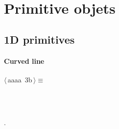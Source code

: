 \documentclass[11pt,oneside]{article}	%
\begin{document}
\section{Primitive objets}
\subsection{1D primitives}

\paragraph{Curved line}
\begin{flushleft} \small \label{scrap5}
\protect{}$\langle\,$aaaa\nobreak\ {\footnotesize 3b}$\,\rangle\equiv$
\vspace{-1ex}
\begin{list}{}{} \item
\mbox{}\verb@@\\
\mbox{}\verb@@\\
\mbox{}\verb@@{\NWsep}
\end{list}
\vspace{-1ex}
\footnotesize\addtolength{\baselineskip}{-1ex}
\begin{list}{}{\setlength{\itemsep}{-\parsep}\setlength{\itemindent}{-\leftmargin}}
\item {\NWtxtMacroNoRef}.
\end{list}
\end{flushleft}
\end{document}
